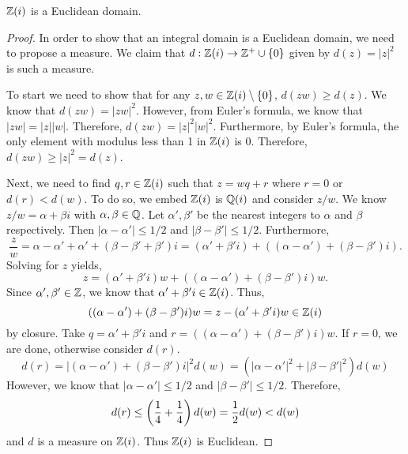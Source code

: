 \documentclass[notitlepage]{simple}
\begin{document}
\begin{thm}
	$\mathbb{Z}(i)$ is a Euclidean domain.
\end{thm}
\begin{proof}
	In order to show that an integral domain is a Euclidean domain, we need to propose a measure.
	We claim that $d:\mathbb{Z}(i)\rightarrow\mathbb{Z}^{+}\cup\lbrace 0 \rbrace$ given by $d(z)=|z|^2$ is such a measure.

	To start we need to show that for any $z,w\in\mathbb{Z}(i)\setminus\lbrace 0 \rbrace$, $d(zw)\geq d(z)$.
	We know that $d(zw)=|zw|^2$.
	However, from Euler's formula, we know that $|zw|=|z||w|$.
	Therefore, $d(zw)=|z|^2|w|^2$.
	Furthermore, by Euler's formula, the only element with modulus less than 1 in $\mathbb{Z}(i)$ is 0.
	Therefore, $d(zw)\geq |z|^2=d(z)$.

	Next, we need to find $q,r\in\mathbb{Z}(i)$ such that $z=wq+r$ where $r=0$ or $d(r) < d(w)$.
	To do so, we embed $\mathbb{Z}(i)$ is $\mathbb{Q}(i)$ and consider $z/w$.
	We know $z/w=\alpha+\beta i$ with $\alpha,\beta\in\mathbb{Q}$.
	Let $\alpha',\beta'$ be the nearest integers to $\alpha$ and $\beta$ respectively.
	Then $|\alpha-\alpha'|\leq 1/2$ and $|\beta-\beta'|\leq 1/2$.
	Furthermore,
	\[
		\frac{z}{w}=\alpha-\alpha'+\alpha' + (\beta-\beta'+\beta')i=(\alpha'+\beta' i)+((\alpha-\alpha')+(\beta-\beta')i).
	\]
	Solving for $z$ yields,
	\[
		z=(\alpha'+\beta' i)w+((\alpha-\alpha')+(\beta-\beta')i)w.
	\]
	Since $\alpha',\beta'\in\mathbb{Z}$, we know that $\alpha'+\beta' i\in\mathbb{Z}(i)$.
	Thus,
	\[
		((\alpha-\alpha')+(\beta-\beta')i)w=z-(\alpha'+\beta' i)w\in\mathbb{Z}(i)
	\]
	by closure.
	Take $q=\alpha'+\beta' i$ and $r=((\alpha-\alpha')+(\beta-\beta')i)w$.
	If $r=0$, we are done, otherwise consider $d(r)$.
	\[
		d(r)=|(\alpha-\alpha')+(\beta-\beta')i|^2d(w)=(|\alpha-\alpha'|^2+|\beta-\beta'|^2)d(w)
	\]
	However, we know that $|\alpha-\alpha'|\leq 1/2$ and $|\beta-\beta'|\leq 1/2$.
	Therefore,
	\[
		d(r)\leq \left( \frac{1}{4}+\frac{1}{4} \right)d(w)=\frac{1}{2}d(w) < d(w)
	\]
	and $d$ is a measure on $\mathbb{Z}(i)$.
	Thus $\mathbb{Z}(i)$ is Euclidean.
\end{proof}
\end{document}
